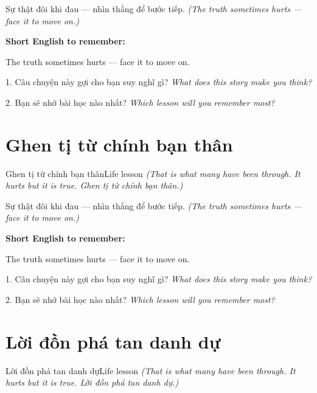 \begin{baihoc}
Sự thật đôi khi đau — nhìn thẳng để bước tiếp.
\textit{(The truth sometimes hurts — face it to move on.)}
\end{baihoc}

\begin{ghinhoanh}
\textbf{Short English to remember:}

The truth sometimes hurts — face it to move on.

\end{ghinhoanh}

\begin{tuhocnhanh}
1. Câu chuyện này gợi cho bạn suy nghĩ gì? \textit{What does this story make you think?}

2. Bạn sẽ nhớ bài học nào nhất? \textit{Which lesson will you remember most?}
\end{tuhocnhanh}
\ngancach


\section{Ghen tị từ chính bạn thân}
\begin{truyen}{Ghen tị từ chính bạn thân}{Life lesson}
\textit{(That is what many have been through. It hurts but it is true. Ghen tị từ chính bạn thân.)}
\end{truyen}

\begin{baihoc}
Sự thật đôi khi đau — nhìn thẳng để bước tiếp.
\textit{(The truth sometimes hurts — face it to move on.)}
\end{baihoc}

\begin{ghinhoanh}
\textbf{Short English to remember:}

The truth sometimes hurts — face it to move on.

\end{ghinhoanh}

\begin{tuhocnhanh}
1. Câu chuyện này gợi cho bạn suy nghĩ gì? \textit{What does this story make you think?}

2. Bạn sẽ nhớ bài học nào nhất? \textit{Which lesson will you remember most?}
\end{tuhocnhanh}
\ngancach


\section{Lời đồn phá tan danh dự}
\begin{truyen}{Lời đồn phá tan danh dự}{Life lesson}
\textit{(That is what many have been through. It hurts but it is true. Lời đồn phá tan danh dự.)}
\end{truyen}


